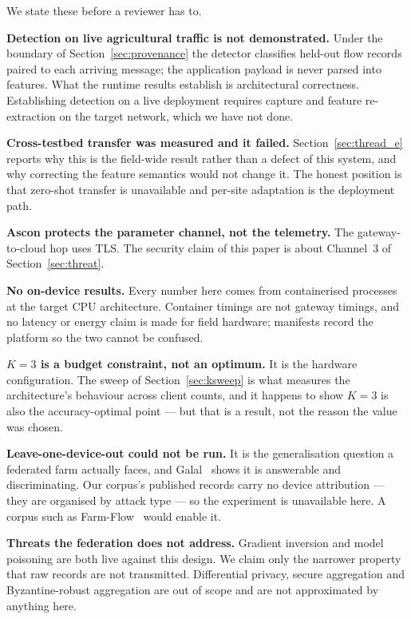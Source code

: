 \documentclass[conference]{IEEEtran}
\begin{document}
We state these before a reviewer has to.

\textbf{Detection on live agricultural traffic is not demonstrated.} Under the boundary of
Section~\ref{sec:provenance} the detector classifies held-out flow records paired to each arriving
message; the application payload is never parsed into features. What the runtime results establish
is architectural correctness. Establishing detection on a live deployment requires capture and
feature re-extraction on the target network, which we have not done.

\textbf{Cross-testbed transfer was measured and it failed.} Section~\ref{sec:thread_e} reports why
this is the field-wide result rather than a defect of this system, and why correcting the feature
semantics would not change it. The honest position is that zero-shot transfer is unavailable and
per-site adaptation is the deployment path.

\textbf{Ascon protects the parameter channel, not the telemetry.} The gateway-to-cloud hop uses
TLS. The security claim of this paper is about Channel~3 of Section~\ref{sec:threat}.

\textbf{No on-device results.} Every number here comes from containerised processes at the target
CPU architecture. Container timings are not gateway timings, and no latency or energy claim is
made for field hardware; manifests record the platform so the two cannot be confused.

\textbf{$K = 3$ is a budget constraint, not an optimum.} It is the hardware configuration. The
sweep of Section~\ref{sec:ksweep} is what measures the architecture's behaviour across client
counts, and it happens to show $K = 3$ is also the accuracy-optimal point --- but that is a result,
not the reason the value was chosen.

\textbf{Leave-one-device-out could not be run.} It is the generalisation question a federated farm
actually faces, and Galal~\cite{galal2026provenance} shows it is answerable and discriminating.
Our corpus's published records carry no device attribution --- they are organised by attack type
--- so the experiment is unavailable here. A corpus such as Farm-Flow~\cite{ferreira2025farmflow} would
enable it.

\textbf{Threats the federation does not address.} Gradient inversion and model poisoning are both
live against this design. We claim only the narrower property that raw records are not
transmitted. Differential privacy, secure aggregation and Byzantine-robust aggregation are out of
scope and are not approximated by anything here.
\end{document}
